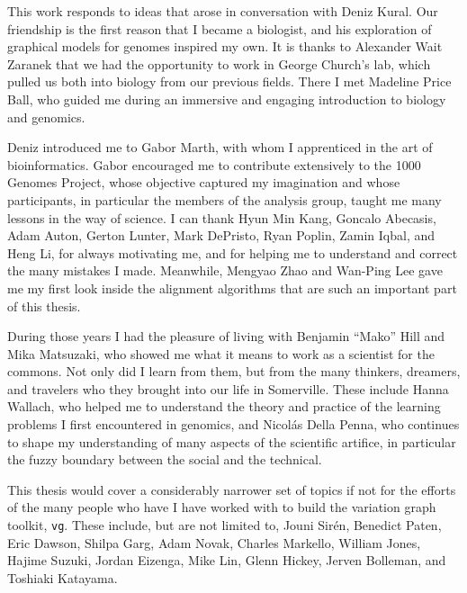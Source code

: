 
\begin{acknowledgements}

  This work responds to ideas that arose in conversation with Deniz Kural.
  Our friendship is the first reason that I became a biologist, and his exploration of graphical models for genomes inspired my own.
  It is thanks to Alexander Wait Zaranek that we had the opportunity to work in George Church's lab, which pulled us both into biology from our previous fields.
  There I met Madeline Price Ball, who guided me during an immersive and engaging introduction to biology and genomics.
  
  Deniz introduced me to Gabor Marth, with whom I apprenticed in the art of bioinformatics.
  Gabor encouraged me to contribute extensively to the 1000 Genomes Project, whose objective captured my imagination and whose participants, in particular the members of the analysis group, taught me many lessons in the way of science.
  I can thank Hyun Min Kang, Goncalo Abecasis, Adam Auton, Gerton Lunter, Mark DePristo, Ryan Poplin, Zamin Iqbal, and Heng Li, for always motivating me, and for helping me to understand and correct the many mistakes I made.
  Meanwhile, Mengyao Zhao and Wan-Ping Lee gave me my first look inside the alignment algorithms that are such an important part of this thesis.

  During those years I had the pleasure of living with Benjamin ``Mako'' Hill and Mika Matsuzaki, who showed me what it means to work as a scientist for the commons.
  Not only did I learn from them, but from the many thinkers, dreamers, and travelers who they brought into our life in Somerville.
  These include Hanna Wallach, who helped me to understand the theory and practice of the learning problems I first encountered in genomics, and Nicol\'{a}s Della Penna, who continues to shape my understanding of many aspects of the scientific artifice, in particular the fuzzy boundary between the social and the technical.
  
  This thesis would cover a considerably narrower set of topics if not for the efforts of the many people who have I have worked with to build the variation graph toolkit, {\tt vg}.
  These include, but are not limited to,
  Jouni Sir\'{e}n,
  Benedict Paten,
  Eric Dawson,
  Shilpa Garg,
  Adam Novak,
  Charles Markello,
  William Jones,
  Hajime Suzuki,
  Jordan Eizenga,
  Mike Lin,
  Glenn Hickey,
  Jerven Bolleman,
  and Toshiaki Katayama.


\end{acknowledgements}
